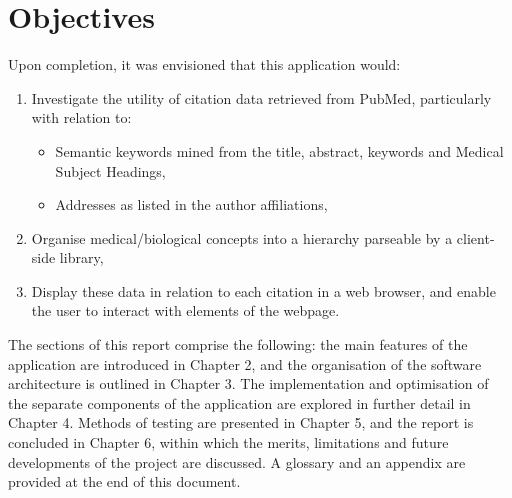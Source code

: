 \documentclass[Report.tex]{subfiles}
\begin{document}
\section{Objectives}
Upon completion, it was envisioned that this application would:

\begin{enumerate}
\item Investigate the utility of citation data retrieved from PubMed, particularly with relation to:
	\begin{itemize}
	\item Semantic keywords mined from the title, abstract, keywords and Medical Subject Headings,
	\item Addresses as listed in the author affiliations,
	\end{itemize}
\item Organise medical/biological concepts into a hierarchy parseable by a client-side library,
\item Display these data in relation to each citation in a web browser, and enable the user to interact with elements of the webpage.
\end{enumerate}

\noindent The sections of this report comprise the following: the main features of the application are introduced in Chapter 2, and the organisation of the software architecture is outlined in Chapter 3. The implementation and optimisation of the separate components of the application are explored in further detail in Chapter 4. Methods of testing are presented in Chapter 5, and the report is concluded in Chapter 6, within which the merits, limitations and future developments of the project are discussed. A glossary and an appendix are provided at the end of this document.
\end{document}
